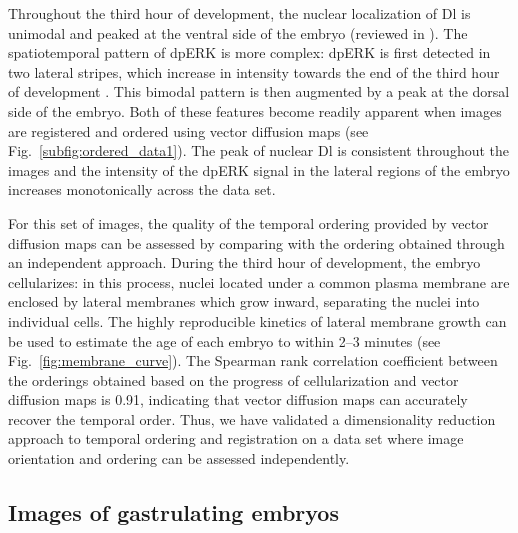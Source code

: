 \documentclass{pnastwo}
\newcommand{\fig}[0]{Fig.}
\begin{document}
\begin{article}
Throughout the third hour of development, the nuclear localization of Dl is unimodal and peaked at the ventral side of the embryo (reviewed in \cite{rushlow2012temporal}).
%
The spatiotemporal pattern of dpERK is more complex: dpERK is first detected in two lateral stripes, which increase in intensity towards the end of the third hour of development \cite{lim2013kinetics}.
%
This bimodal pattern is then augmented by a peak at the dorsal side of the embryo.
%
Both of these features become readily apparent when images are registered and ordered using vector diffusion maps (see \fig~\ref{subfig:ordered_data1}).
%
The peak of nuclear Dl is consistent throughout the images and the intensity of the dpERK signal in the lateral regions of the embryo increases monotonically across the data set.
%

For this set of images, the quality of the temporal ordering provided by vector diffusion maps can be assessed by comparing with the ordering obtained through an independent approach.
%
During the third hour of development, the embryo cellularizes: in this process, nuclei located under a common plasma membrane are enclosed by lateral membranes which grow inward, separating the nuclei into individual cells.
%
The highly reproducible kinetics of lateral membrane growth can be used to estimate the age of each embryo to within 2--3 minutes \cite{figard2013plasma} (see \fig~\ref{fig:membrane_curve}).
%
The Spearman rank correlation coefficient between the orderings obtained based on the progress of cellularization and vector diffusion maps is 0.91, indicating that vector diffusion maps can accurately recover the temporal order.
%
Thus, we have validated a dimensionality reduction approach to temporal ordering and registration on a data set where image orientation and ordering can be assessed independently.


\subsection{Images of gastrulating embryos}


\end{article}
\end{document}
